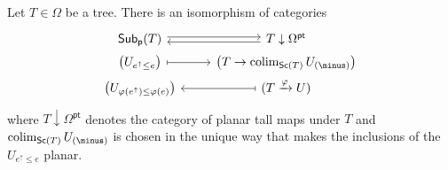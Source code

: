 \documentclass[a4paper,10pt]{article}%
\begin{document}
\begin{proposition}\label{SUBDATAUNDERPLAN PROP}
Let $T \in \Omega$ be a tree. There is an isomorphism of categories
\[
\begin{tikzcd}[row sep =0pt]
	\mathsf{Sub}_{\mathsf{p}}(T) \ar[r,shift left=2pt] &
	T \downarrow \Omega^{\mathsf{pt}} \ar[l,shift left=2pt]
\\
	\left(U_{e^{\uparrow} \leq e}\right) \ar[r,mapsto] & 
	\left(T \to \colim_{\mathsf{Sc}(T)} U_{(\minus)}\right)
\\
	\left(U_{\varphi(e^{\uparrow}) \leq \varphi(e)}\right) &
	(T \xrightarrow{\varphi} U) \ar[l,mapsto]
\end{tikzcd}
\]
where $T \downarrow \Omega^{\mathsf{pt}}$ denotes
the category of planar tall maps under $T$
and $\colim_{\mathsf{Sc}(T)} U_{(\minus)}$ is chosen in the unique way that makes the inclusions of the $U_{e^{\uparrow} \leq e}$ planar. 
\end{proposition}
\end{document}
